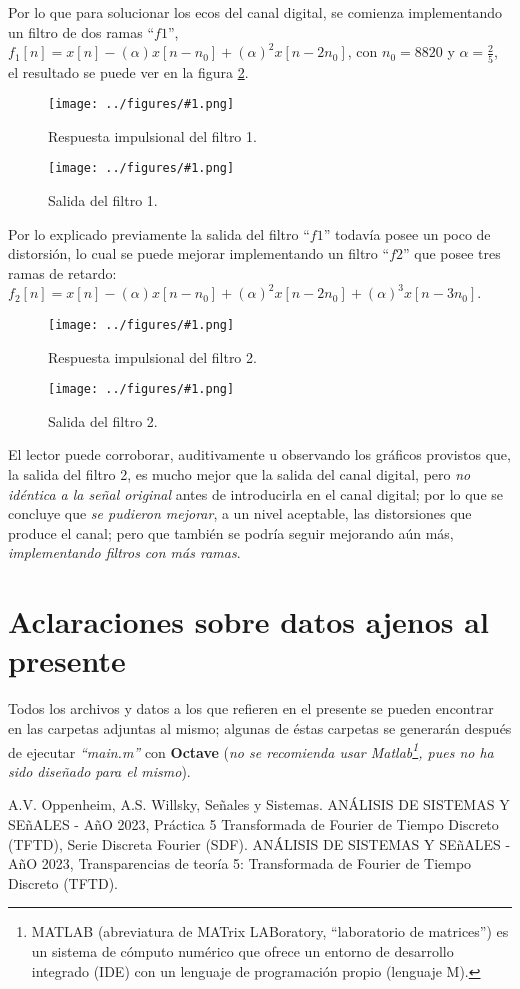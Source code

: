 \documentclass[letterpaper, 10 pt, conference]{ieeeconf}  %
\newcommand{\image}[2] {
  \begin{figure}[H]
    \centering
    \texttt{[image: ../figures/\#1.png]}
    \caption{#2}
    \label{fig:#1}
  \end{figure}
}
\begin{document}
Por lo que para solucionar los ecos del canal digital, se comienza implementando un filtro de dos ramas ``$f1$'', $f_1[n]=x[n]-(\alpha)x[n-n_0]+(\alpha)^2x[n-2n_0]$, con $n_0=8820$ y $\alpha=\frac{2}{5}$, el resultado se puede ver en la figura \ref{fig:y-filtro1}.
\image{h-filtro1}{Respuesta impulsional del filtro 1.}
\image{y-filtro1}{Salida del filtro 1.}

Por lo explicado previamente la salida del filtro ``$f1$'' todav\'ia posee un poco de distorsi\'on, lo cual se puede mejorar implementando un filtro ``$f2$'' que posee tres ramas de retardo: $f_2[n] = x[n] - (\alpha)x[n-n_0] + (\alpha)^2x[n-2n_0] + (\alpha)^3x[n-3n_0]$.
\image{h-filtro2}{Respuesta impulsional del filtro 2.}
\image{y-filtro2}{Salida del filtro 2.}

\begin{minipage}{\linewidth}
  El lector puede corroborar, auditivamente u observando los gr\'aficos provistos que, la salida del filtro 2, es mucho mejor que la salida del canal digital, pero \textit{no id\'entica a la se\~nal original} antes de introducirla en el canal digital; por lo que se concluye que \textit{se pudieron mejorar}, a un nivel aceptable, las distorsiones que produce el canal; pero que tambi\'en se podr\'ia seguir mejorando a\'un m\'as, \textit{implementando filtros con m\'as ramas}.
\end{minipage}

\section{Aclaraciones sobre datos ajenos al presente}
Todos los archivos y datos a los que refieren en el presente se pueden encontrar en las carpetas adjuntas al mismo; algunas de \'estas carpetas se generar\'an despu\'es de ejecutar \textit{``main.m''} con \textbf{Octave} (\textit{no se recomienda usar Matlab\footnote{MATLAB (abreviatura de MATrix LABoratory, ``laboratorio de matrices'') es un sistema de c\'omputo num\'erico que ofrece un entorno de desarrollo integrado (IDE) con un lenguaje de programaci\'on propio (lenguaje M).}, pues no ha sido dise\~nado para el mismo}).

\begin{thebibliography}{99}
  
A.V. Oppenheim, A.S. Willsky, Se\~nales y Sistemas.
ANÁLISIS DE SISTEMAS Y SE\~{n}ALES - A\~{n}O 2023, Práctica 5 Transformada de Fourier de Tiempo Discreto (TFTD), Serie Discreta Fourier (SDF).
ANÁLISIS DE SISTEMAS Y SE\~{n}ALES - A\~{n}O 2023, Transparencias de teor\'ia 5: Transformada de Fourier de Tiempo Discreto (TFTD).

\end{thebibliography}
\end{document}
